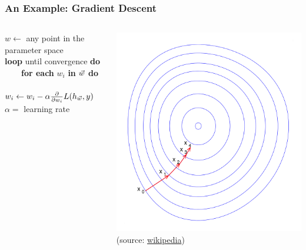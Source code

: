 \documentclass{beamer}
\begin{document}
\begin{frame}
    \frametitle{An Example: Gradient Descent}
    \begin{columns}
        \begin{column}{.5\textwidth}
            $w \leftarrow$ any point in the parameter space\\
            \textbf{loop} until convergence \textbf{do}\\
            ~~~~\textbf{for each} $w_i$ \textbf{in} $\vec{w}$ \textbf{do}\\
            ~~~~~~~~$w_i \leftarrow w_i - \alpha\frac{\partial}{\partial w_i}
            L(h_{\vec{w}},y)$\\[\baselineskip]
            $\alpha =$ learning rate
        \end{column}
        \begin{column}{.5\textwidth}
            \includegraphics[height=\textwidth]{Gradient_descent}\\
            \hfill\footnotesize (source:
            \href{http://en.wikipedia.org/wiki/Gradient_descent}{wikipedia})
        \end{column}
    \end{columns}
\end{frame}
\end{document}
